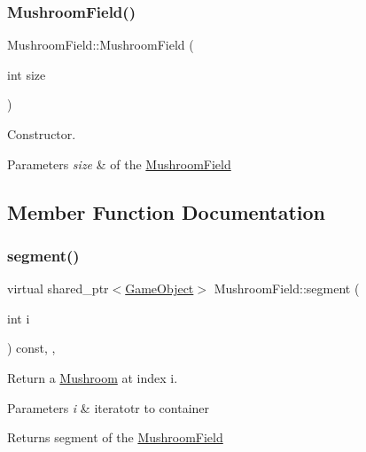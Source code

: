 \subsubsection{\texorpdfstring{Mushroom\+Field()}{MushroomField()}}
{\footnotesize\ttfamily Mushroom\+Field\+::\+Mushroom\+Field (\begin{DoxyParamCaption}\item[{int}]{size }\end{DoxyParamCaption})}



Constructor. 


\begin{DoxyParams}{Parameters}
{\em size} & of the \mbox{\hyperlink{class_mushroom_field}{Mushroom\+Field}} \\
\hline
\end{DoxyParams}


\subsection{Member Function Documentation}
\mbox{\label{class_mushroom_field_a478cc3df9deaf0e7a0b48fd2d128eeb8}} 
\subsubsection{\texorpdfstring{segment()}{segment()}}
{\footnotesize\ttfamily virtual shared\+\_\+ptr$<$\mbox{\hyperlink{class_game_object}{Game\+Object}}$>$ Mushroom\+Field\+::segment (\begin{DoxyParamCaption}\item[{int}]{i }\end{DoxyParamCaption}) const\hspace{0.3cm}{\ttfamily [inline]}, {\ttfamily [override]}, {\ttfamily [virtual]}}



Return a \mbox{\hyperlink{class_mushroom}{Mushroom}} at index i. 


\begin{DoxyParams}{Parameters}
{\em i} & iteratotr to container \\
\hline
\end{DoxyParams}
\begin{DoxyReturn}{Returns}
segment of the \mbox{\hyperlink{class_mushroom_field}{Mushroom\+Field}} 
\end{DoxyReturn}


